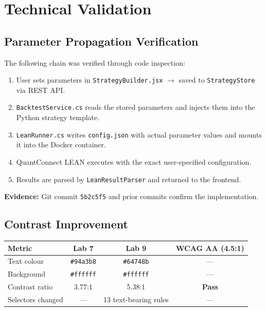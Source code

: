 \documentclass[10pt,a4paper]{article}
\begin{document}
\section{Technical Validation}

\subsection{Parameter Propagation Verification}

The following chain was verified through code inspection:

\begin{enumerate}[nosep]
  \item User sets parameters in \texttt{StrategyBuilder.jsx} $\to$ saved to \texttt{StrategyStore} via REST API.
  \item \texttt{BacktestService.cs} reads the stored parameters and injects them into the Python strategy template.
  \item \texttt{LeanRunner.cs} writes \texttt{config.json} with actual parameter values and mounts it into the Docker container.
  \item QuantConnect LEAN executes with the exact user-specified configuration.
  \item Results are parsed by \texttt{LeanResultParser} and returned to the frontend.
\end{enumerate}

\textbf{Evidence:} Git commit \texttt{5b2c5f5} and prior commits confirm the implementation.

\subsection{Contrast Improvement}

\begin{table}[H]
\centering
\begin{tabular}{l c c c}
\toprule
\textbf{Metric} & \textbf{Lab 7} & \textbf{Lab 9} & \textbf{WCAG AA (4.5:1)} \\
\midrule
Text colour & \texttt{\#94a3b8} & \texttt{\#64748b} & --- \\
Background & \texttt{\#ffffff} & \texttt{\#ffffff} & --- \\
Contrast ratio & 3.77:1 & 5.38:1 & \textbf{Pass} \\
Selectors changed & --- & 13 text-bearing rules & --- \\
\bottomrule
\end{tabular}
\end{table}
\end{document}
